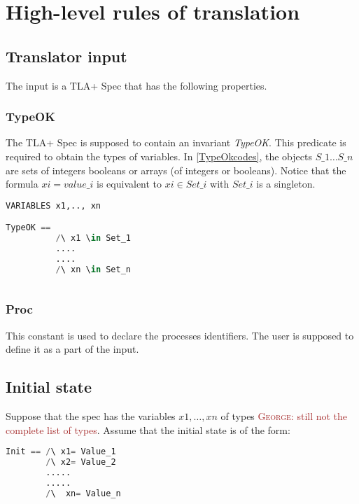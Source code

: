 \documentclass{article}
\theoremstyle{plain}
\numberwithin{equation}{section}
\newcommand{\george}[1]{\textcolor{brown}{\textsc{George: } {\sf #1}}}
\begin{document}
\large

 

\section{High-level rules of translation }
  
\subsection{Translator input}
The input is a TLA+ Spec that has the following properties. 

\subsubsection{TypeOK} The TLA+ Spec is supposed to contain an invariant \emph{TypeOK}.  This predicate is required to obtain the types of variables. In \eqref{TypeOkcodes}, the objects $S\_1 \dots S\_n$ are sets of integers booleans or arrays (of integers or booleans). Notice that the formula $xi=value\_i$ is equivalent to $xi \in Set\_i$ with $Set\_i$ is a singleton. 


\begin{lstlisting}[language=Python,caption={The explicit form of the predicate \emph{TypeOK}.}, label={TypeOkcodes}] 
VARIABLES x1,.., xn

TypeOK == 
          /\ x1 \in Set_1
          ....
          ....
          /\ xn \in Set_n
 
\end{lstlisting}

\subsubsection{Proc} This constant is used to declare the processes identifiers. The user is supposed to define it as a part of the input. 

\subsection{Initial state} 
Suppose that the spec has the variables $x1, \dots, xn$ of types \george{still not the complete list of types}.  
Assume that the initial state is of the form: 

\begin{lstlisting}[language=Python]
Init == /\ x1= Value_1  
        /\ x2= Value_2  
        .....
        .....
        /\  xn= Value_n   
\end{lstlisting}
\end{document}
